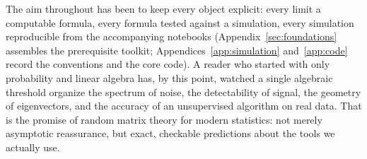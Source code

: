 The aim throughout has been to keep every object explicit: every limit a computable formula, every formula tested against a simulation, every simulation reproducible from the accompanying notebooks (Appendix~\ref{sec:foundations} assembles the prerequisite toolkit; Appendices~\ref{app:simulation} and~\ref{app:code} record the conventions and the core code). A reader who started with only probability and linear algebra has, by this point, watched a single algebraic threshold organize the spectrum of noise, the detectability of signal, the geometry of eigenvectors, and the accuracy of an unsupervised algorithm on real data. That is the promise of random matrix theory for modern statistics: not merely asymptotic reassurance, but exact, checkable predictions about the tools we actually use.

\clearpage
